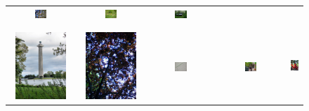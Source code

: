 \begin{figure}[th]
{{\begin{center}
\begin{tabular}{@{}c@{\,\,\,}c@{\,\,\,}c@{\,\,\,}c@{\,\,\,}c@{\,\,\,}}
\includegraphics[width=0.19\textwidth]{imggrid/falseposi/8.jpg} &
\includegraphics[width=0.19\textwidth]{imggrid/falseposi/9.jpg} &
\includegraphics[width=0.19\textwidth]{imggrid/falseposi/10.jpg} \\
\\[-6pt]
\hline
\\[-6pt]
\includegraphics[height=1in]{imggrid/falseposi/11.jpg} &
\includegraphics[height=1in]{imggrid/falseposi/12.jpg} &
\includegraphics[width=0.19\textwidth]{imggrid/falseposi/13.jpg} &
\includegraphics[width=0.19\textwidth]{imggrid/falseposi/14.jpg} &
\includegraphics[height=1in]{imggrid/falseposi/15.jpg} \\

\end{tabular}
\end{center}}}
\end{figure}
